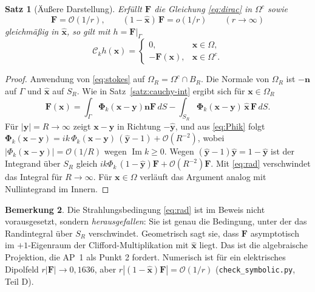 \documentclass[11pt, a4paper]{article}
\newcommand{\mvec}[1]{\boldsymbol{#1}}
\newcommand{\n}{\mvec{n}}
\newcommand{\xh}{\hat{\mvec{x}}}
\theoremstyle{plain}
\newtheorem{satz}{Satz}[section]
\theoremstyle{definition}
\newtheorem{bemerkung}[satz]{Bemerkung}
\newcommand{\status}[1]{\hfill{\small\sffamily[#1]}}
\begin{document}
\begin{satz}[Äußere Darstellung]\label{satz:cauchy-ext}\status{bewiesen, num.\ verif.}
Erfüllt $\mvec{F}$ die Gleichung \eqref{eq:dirac} in $\Omega^c$ sowie
\begin{equation}\label{eq:rad}
  \mvec{F} = \mathcal{O}(1/r),\qquad (1-\xh)\,\mvec{F} = o(1/r)\qquad (r\to\infty)
\end{equation}
gleichmäßig in $\xh$, so gilt mit $h=\mvec{F}|_\Gamma$
\[
  \mathcal{C}_kh(\mvec{x}) = \begin{cases}0, & \mvec{x}\in\Omega,\\
  -\mvec{F}(\mvec{x}), & \mvec{x}\in\Omega^c.\end{cases}
\]
\end{satz}
\begin{proof}
Anwendung von \eqref{eq:stokes} auf $\Omega_R = \Omega^c\cap B_R$. Die
Normale von $\Omega_R$ ist $-\n$ auf $\Gamma$ und $\xh$ auf $S_R$. Wie in
Satz~\ref{satz:cauchy-int} ergibt sich für $\mvec{x}\in\Omega_R$
\[
  \mvec{F}(\mvec{x}) = \int_\Gamma \mvec{\Phi}_k(\mvec{x}-\mvec{y})\n\mvec{F}\,dS
  - \int_{S_R}\mvec{\Phi}_k(\mvec{x}-\mvec{y})\,\xh\,\mvec{F}\,dS .
\]
Für $|\mvec{y}| = R\to\infty$ zeigt $\mvec{x}-\mvec{y}$ in Richtung $-\hat{\mvec{y}}$,
und aus \eqref{eq:Phik} folgt $\mvec{\Phi}_k(\mvec{x}-\mvec{y}) =
ik\,\Phi_k(\mvec{x}-\mvec{y})\,(\hat{\mvec{y}}-1) + \mathcal{O}(R^{-2})$, wobei
$|\Phi_k(\mvec{x}-\mvec{y})| = \mathcal{O}(1/R)$ wegen $\operatorname{Im}k\ge0$. Wegen
$(\hat{\mvec{y}}-1)\hat{\mvec{y}} = 1-\hat{\mvec{y}}$ ist der Integrand über $S_R$ gleich
$ik\Phi_k\,(1-\hat{\mvec{y}})\mvec{F} + \mathcal{O}(R^{-2})\mvec{F}$. Mit
\eqref{eq:rad} verschwindet das Integral für $R\to\infty$. Für $\mvec{x}\in\Omega$
verläuft das Argument analog mit Nullintegrand im Innern.
\end{proof}

\begin{bemerkung}
Die Strahlungsbedingung \eqref{eq:rad} ist im Beweis nicht vorausgesetzt, sondern
\emph{herausgefallen}: Sie ist genau die Bedingung, unter der das Randintegral
über $S_R$ verschwindet. Geometrisch sagt sie, dass $\mvec{F}$ asymptotisch im
$+1$-Eigenraum der Clifford-Multiplikation mit $\xh$ liegt. Das ist die
algebraische Projektion, die AP~1 als Punkt 2 fordert. Numerisch ist für ein
elektrisches Dipolfeld $r|\mvec{F}|\to 0{,}1636$, aber $r|(1-\xh)\mvec{F}| =
\mathcal{O}(1/r)$ (\texttt{check\_symbolic.py}, Teil D).
\end{bemerkung}
\end{document}
